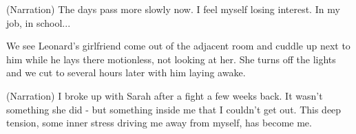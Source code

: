 \documentclass{article}
\begin{document}
\begin{description}
\item{(Narration)} The days pass more slowly now. I feel myself losing interest. In my job, in school...
\end{description}
We see Leonard's girlfriend come out of the adjacent room and cuddle up next to him while he lays there motionless, not looking at her. She turns off the lights and we cut to several hours later with him laying awake.
\begin{description}
\item{(Narration)} I broke up with Sarah after a fight a few weeks back. It wasn't something she did - but something inside me that I couldn't get out. This deep tension, some inner stress driving me away from myself, has become me.
\end{description}
\end{document}
